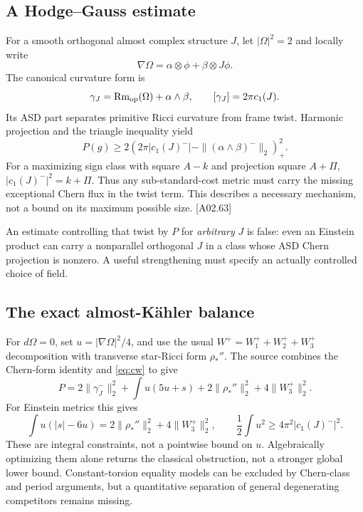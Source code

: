 \documentclass[11pt]{article}
\newcommand{\Rm}{\operatorname{Rm}}
\newcommand{\sref}[1]{\textsf{[#1]}}
\theoremstyle{remark}
\begin{document}
\subsection{A Hodge--Gauss estimate}
For a smooth orthogonal almost complex structure $J$, let $|\Omega|^2=2$ and
locally write
\[
 \nabla\Omega=\alpha\otimes\phi+\beta\otimes J\phi.
\]
The canonical curvature form is
\[
 \gamma_J=\Rm_{\rm op}(\Omega)+\alpha\wedge\beta,
 \qquad[\gamma_J]=2\pi c_1(J).
\]
Its ASD part separates primitive Ricci curvature from frame twist.
Harmonic projection and the triangle inequality yield
\begin{equation}
 P(g)\ge2\left(2\pi|c_1(J)^-|-
       \|(\alpha\wedge\beta)^-\|_2\right)_+^2.
 \label{eq:twist}
\end{equation}
For a maximizing sign class with square $A-k$ and projection square
$A+\Pi$, $|c_1(J)^-|^2=k+\Pi$. Thus any sub-standard-cost metric must carry
the missing exceptional Chern flux in the twist term. This describes a
necessary mechanism, not a bound on its maximum possible size.
\sref{A02.63}

An estimate controlling that twist by $P$ for \emph{arbitrary} $J$ is false:
even an Einstein product can carry a nonparallel orthogonal $J$ in a class
whose ASD Chern projection is nonzero. A useful strengthening must specify
an actually controlled choice of field.

\subsection{The exact almost-K\"ahler balance}
For $d\Omega=0$, set $u=|\nabla\Omega|^2/4$, and use the usual
$W^+=W_1^++W_2^++W_3^+$ decomposition with transverse star-Ricci form
$\rho_*''$. The source combines the Chern-form identity and
\eqref{eq:cw} to give
\begin{equation}
 P=2\|\gamma_J^-\|_2^2+\int u(5u+s)
     +2\|\rho_*''\|_2^2+4\|W_3^+\|_2^2.\label{eq:ak}
\end{equation}
For Einstein metrics this gives
\[
 \int u(|s|-6u)=2\|\rho_*''\|_2^2+4\|W_3^+\|_2^2,
 \qquad \frac12\int u^2\ge4\pi^2|c_1(J)^-|^2.
\]
These are integral constraints, not a pointwise bound on $u$. Algebraically
optimizing them alone returns the classical obstruction, not a stronger
global lower bound. Constant-torsion equality models can be excluded by
Chern-class and period arguments, but a quantitative separation of general
degenerating competitors remains missing.
\end{document}
